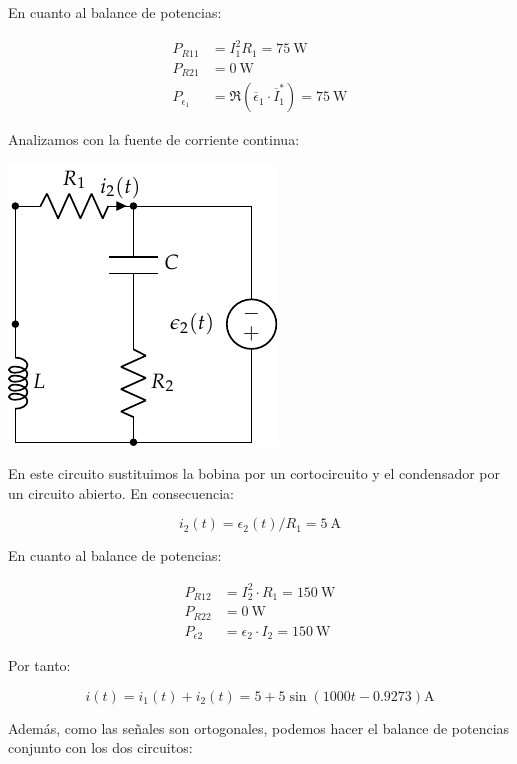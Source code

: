 \documentclass[12pt]{article}
\begin{document}
En cuanto al balance de potencias:

\begin{align*}
  P_{R11} &= I_1^2 R_1 = \SI{75}{\watt}\\
  P_{R21} &= \SI{0}{\watt}\\
  P_{\epsilon_1} &= \Re(\overline{\epsilon}_1 \cdot \overline{I}_1^*) = \SI{75}{\watt}
\end{align*}

Analizamos con la fuente de corriente continua:

\begin{center}
\includegraphics{../figs/superposicion1_DC}
\end{center}

En este circuito sustituimos la bobina por un cortocircuito y el condensador por un circuito abierto. En consecuencia:

\begin{equation*}
  i_2(t) = \epsilon_2(t) / R_1 = \SI{5}{\ampere}
\end{equation*}

En cuanto al balance de potencias:

\begin{align*}
  P_{R12} &= I_2^2 \cdot R_1 = \SI{150}{\watt}\\
  P_{R22} &= \SI{0}{\watt}\\
  P_{\epsilon2} &= \epsilon_2 \cdot I_2 = \SI{150}{\watt}
\end{align*}

Por tanto:

\begin{equation*}
  i(t) = i_1(t) + i_2(t) = 5 + 5\sin(1000t - 0.9273)\si{\ampere}
\end{equation*}

Además, como las señales son ortogonales, podemos hacer el balance de potencias conjunto con los dos circuitos:
\end{document}
